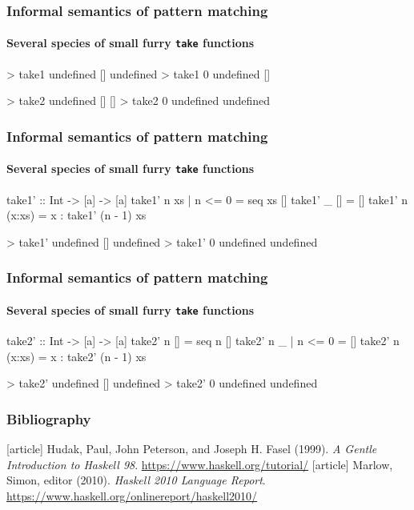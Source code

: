 \documentclass{beamer}
\begin{document}
\begin{frame}[fragile]
  \frametitle{Informal semantics of pattern matching}
  \framesubtitle{Several species of small furry \texttt{take} functions}

  \begin{code}
> take1 undefined []
undefined
> take1 0 undefined
[]
  \end{code}
  \begin{code}
> take2 undefined []
[]
> take2 0 undefined
undefined
  \end{code}
\end{frame}

\begin{frame}[fragile]
  \frametitle{Informal semantics of pattern matching}
  \framesubtitle{Several species of small furry \texttt{take} functions}

  \begin{code}
take1' :: Int -> [a] -> [a]
take1' n xs     | n <= 0 = seq xs []
take1' _ []              = []
take1' n (x:xs)          = x : take1' (n - 1) xs
  \end{code}
  \begin{code}
> take1' undefined []
undefined
> take1' 0 undefined
undefined
  \end{code}
\end{frame}

\begin{frame}[fragile]
  \frametitle{Informal semantics of pattern matching}
  \framesubtitle{Several species of small furry \texttt{take} functions}

  \begin{code}
take2' :: Int -> [a] -> [a]
take2' n []              = seq n []
take2' n _      | n <= 0 = []
take2' n (x:xs)          = x : take2' (n - 1) xs
  \end{code}
  \begin{code}
> take2' undefined []
undefined
> take2' 0 undefined
undefined
  \end{code}
\end{frame}


\begin{frame}
  \frametitle{Bibliography}

  \begin{thebibliography}{Hudak, Peterson, and Fasel 1999}
  [article]
    Hudak, Paul, John Peterson, and Joseph H. Fasel (1999).
    \newblock \emph{A Gentle Introduction to Haskell 98}.
    \newblock \url{https://www.haskell.org/tutorial/}
  [article]
    Marlow, Simon, editor (2010).
    \newblock \emph{Haskell 2010 Language Report}.
    \newblock \url{https://www.haskell.org/onlinereport/haskell2010/}
  \end{thebibliography}
\end{frame}

\end{document}

